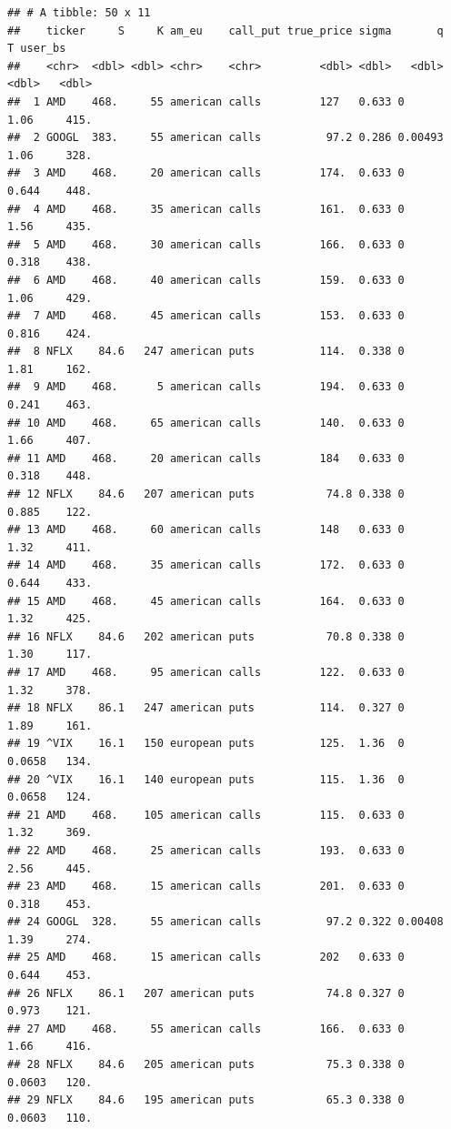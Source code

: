\documentclass[
]{article}
\begin{document}
\begin{verbatim}
## # A tibble: 50 x 11
##    ticker     S     K am_eu    call_put true_price sigma       q      T user_bs
##    <chr>  <dbl> <dbl> <chr>    <chr>         <dbl> <dbl>   <dbl>  <dbl>   <dbl>
##  1 AMD    468.     55 american calls         127   0.633 0       1.06     415. 
##  2 GOOGL  383.     55 american calls          97.2 0.286 0.00493 1.06     328. 
##  3 AMD    468.     20 american calls         174.  0.633 0       0.644    448. 
##  4 AMD    468.     35 american calls         161.  0.633 0       1.56     435. 
##  5 AMD    468.     30 american calls         166.  0.633 0       0.318    438. 
##  6 AMD    468.     40 american calls         159.  0.633 0       1.06     429. 
##  7 AMD    468.     45 american calls         153.  0.633 0       0.816    424. 
##  8 NFLX    84.6   247 american puts          114.  0.338 0       1.81     162. 
##  9 AMD    468.      5 american calls         194.  0.633 0       0.241    463. 
## 10 AMD    468.     65 american calls         140.  0.633 0       1.66     407. 
## 11 AMD    468.     20 american calls         184   0.633 0       0.318    448. 
## 12 NFLX    84.6   207 american puts           74.8 0.338 0       0.885    122. 
## 13 AMD    468.     60 american calls         148   0.633 0       1.32     411. 
## 14 AMD    468.     35 american calls         172.  0.633 0       0.644    433. 
## 15 AMD    468.     45 american calls         164.  0.633 0       1.32     425. 
## 16 NFLX    84.6   202 american puts           70.8 0.338 0       1.30     117. 
## 17 AMD    468.     95 american calls         122.  0.633 0       1.32     378. 
## 18 NFLX    86.1   247 american puts          114.  0.327 0       1.89     161. 
## 19 ^VIX    16.1   150 european puts          125.  1.36  0       0.0658   134. 
## 20 ^VIX    16.1   140 european puts          115.  1.36  0       0.0658   124. 
## 21 AMD    468.    105 american calls         115.  0.633 0       1.32     369. 
## 22 AMD    468.     25 american calls         193.  0.633 0       2.56     445. 
## 23 AMD    468.     15 american calls         201.  0.633 0       0.318    453. 
## 24 GOOGL  328.     55 american calls          97.2 0.322 0.00408 1.39     274. 
## 25 AMD    468.     15 american calls         202   0.633 0       0.644    453. 
## 26 NFLX    86.1   207 american puts           74.8 0.327 0       0.973    121. 
## 27 AMD    468.     55 american calls         166.  0.633 0       1.66     416. 
## 28 NFLX    84.6   205 american puts           75.3 0.338 0       0.0603   120. 
## 29 NFLX    84.6   195 american puts           65.3 0.338 0       0.0603   110. 

\end{verbatim}
\end{document}
